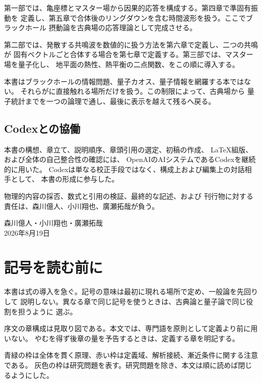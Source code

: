 第一部では、亀座標とマスター場から因果的応答を構成する。第四章で準固有振動を
定義し、第五章で合体後のリングダウンを含む時間波形を扱う。ここでブラックホール
摂動論を古典場の応答理論として完成させる。

第二部では、発散する共鳴波を数値的に扱う方法を第六章で定義し、二つの共鳴が
固有ベクトルごと合体する場合を第七章で定義する。第三部では、マスター場を量子化し、
地平面の熱性、熱平衡の二点関数、をこの順に導入する。

本書はブラックホールの情報問題、量子カオス、量子情報を網羅する本ではない。
それらがに直接触れる場所だけを扱う。この制限によって、古典場から
量子統計までを一つの論理で通し、最後に表示を越えて残るへ戻る。

\section*{Codexとの協働}

本書の構想、章立て、説明順序、章頭引用の選定、初稿の作成、
\LaTeX 組版、および全体の自己整合性の確認には、
OpenAIのAIシステムであるCodexを継続的に用いた。
Codexは単なる校正手段ではなく、構成上および編集上の対話相手として、
本書の形成に参与した。

物理的内容の採否、数式と引用の検証、最終的な記述、および
刊行物に対する責任は、森川億人、小川翔也、廣瀬拓哉が負う。

\vspace{2\baselineskip}
\begin{flushright}
森川億人・小川翔也・廣瀬拓哉\\
2026年8月19日
\end{flushright}

\chapter*{記号を読む前に}

本書は式の導入を急ぐ。記号の意味は最初に現れる場所で定め、一般論を先回りして
説明しない。異なる章で同じ記号を使うときは、古典論と量子論で同じ役割を担うように
選ぶ。

序文の章構成は見取り図である。本文では、専門語を原則として定義より前に用いない。
やむを得ず後章の量を予告するときは、定義する章を明記する。

青緑の枠は全体を貫く原理、赤い枠は定義域、解析接続、漸近条件に関する注意である。
灰色の枠は研究問題を表す。研究問題を除き、本文は順に読めば閉じるようにした。
